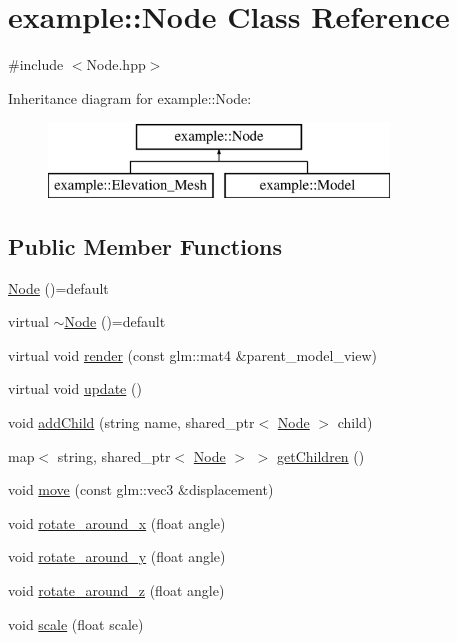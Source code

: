 \hypertarget{classexample_1_1_node}{}\section{example\+:\+:Node Class Reference}
\label{classexample_1_1_node}


{\ttfamily \#include $<$Node.\+hpp$>$}

Inheritance diagram for example\+:\+:Node\+:\begin{figure}[H]
\begin{center}
\leavevmode
\includegraphics[height=2.000000cm]{classexample_1_1_node}
\end{center}
\end{figure}
\subsection*{Public Member Functions}
\begin{DoxyCompactItemize}
\item 
\mbox{\hyperlink{classexample_1_1_node_a064cdd4ba93aa74cff9f5b037ed84bbf}{Node}} ()=default
\item 
virtual \mbox{\hyperlink{classexample_1_1_node_a0d38a83c31d57519fd1df600f1f30e27}{$\sim$\+Node}} ()=default
\item 
virtual void \mbox{\hyperlink{classexample_1_1_node_a520d3d88a4600b0d9987dbeae10ddede}{render}} (const glm\+::mat4 \&parent\+\_\+model\+\_\+view)
\item 
virtual void \mbox{\hyperlink{classexample_1_1_node_a6d570b9e13063686b8057d8f561e196e}{update}} ()
\item 
void \mbox{\hyperlink{classexample_1_1_node_a67a27b32f8d6211bac54a7ef5e8c8dc6}{add\+Child}} (string name, shared\+\_\+ptr$<$ \mbox{\hyperlink{classexample_1_1_node}{Node}} $>$ child)
\item 
map$<$ string, shared\+\_\+ptr$<$ \mbox{\hyperlink{classexample_1_1_node}{Node}} $>$ $>$ \mbox{\hyperlink{classexample_1_1_node_a35e8fbeddcdf711d734bd00a470f0178}{get\+Children}} ()
\item 
void \mbox{\hyperlink{classexample_1_1_node_af0193704909c9018ba9ceab210556bb7}{move}} (const glm\+::vec3 \&displacement)
\item 
void \mbox{\hyperlink{classexample_1_1_node_ab4eff1ab9218668c46dcb2d436db93be}{rotate\+\_\+around\+\_\+x}} (float angle)
\item 
void \mbox{\hyperlink{classexample_1_1_node_a0f0b0dcf74439bd1b31b7e86908586b5}{rotate\+\_\+around\+\_\+y}} (float angle)
\item 
void \mbox{\hyperlink{classexample_1_1_node_aae218610f555df382bd7cdf63b794fb0}{rotate\+\_\+around\+\_\+z}} (float angle)
\item 
void \mbox{\hyperlink{classexample_1_1_node_ab1fbe6b0c8bcb630130f5f39a1b85769}{scale}} (float scale)
\end{DoxyCompactItemize}
